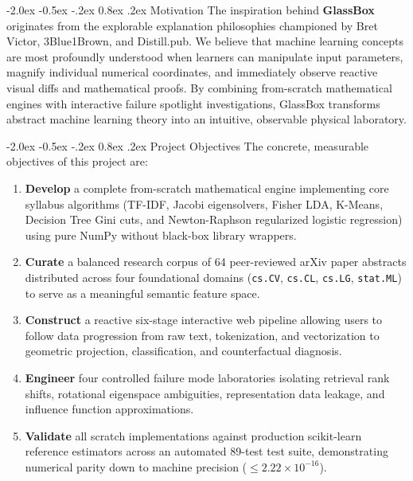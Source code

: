 \documentclass[12pt,a4paper]{report}
\makeatletter
\newenvironment{tightenumerate}{%
  \begin{enumerate}%
    \setlength{\itemsep}{1.5pt}%
    \setlength{\parskip}{0pt}%
    \setlength{\parsep}{0pt}%
}{%
  \end{enumerate}%
}
\renewcommand\section{\@startsection {section}{1}{\z@}%
                                   {-2.0ex \@plus -0.5ex \@minus -.2ex}%
                                   {0.8ex \@plus.2ex}%
                                   {\normalfont\fontsize{14}{17}\bfseries\color{headerblue}}}
\makeatother
\begin{document}
\section{Motivation}
The inspiration behind \textbf{GlassBox} originates from the explorable explanation philosophies championed by Bret Victor, 3Blue1Brown, and Distill.pub. We believe that machine learning concepts are most profoundly understood when learners can manipulate input parameters, magnify individual numerical coordinates, and immediately observe reactive visual diffs and mathematical proofs. By combining from-scratch mathematical engines with interactive failure spotlight investigations, GlassBox transforms abstract machine learning theory into an intuitive, observable physical laboratory.

\section{Project Objectives}
The concrete, measurable objectives of this project are:
\begin{tightenumerate}
    \item \textbf{Develop} a complete from-scratch mathematical engine implementing core syllabus algorithms (TF-IDF, Jacobi eigensolvers, Fisher LDA, K-Means, Decision Tree Gini cuts, and Newton-Raphson regularized logistic regression) using pure NumPy without black-box library wrappers.
    \item \textbf{Curate} a balanced research corpus of 64 peer-reviewed arXiv paper abstracts distributed across four foundational domains (\texttt{cs.CV}, \texttt{cs.CL}, \texttt{cs.LG}, \texttt{stat.ML}) to serve as a meaningful semantic feature space.
    \item \textbf{Construct} a reactive six-stage interactive web pipeline allowing users to follow data progression from raw text, tokenization, and vectorization to geometric projection, classification, and counterfactual diagnosis.
    \item \textbf{Engineer} four controlled failure mode laboratories isolating retrieval rank shifts, rotational eigenspace ambiguities, representation data leakage, and influence function approximations.
    \item \textbf{Validate} all scratch implementations against production scikit-learn reference estimators across an automated 89-test test suite, demonstrating numerical parity down to machine precision ($\le 2.22 \times 10^{-16}$).
\end{tightenumerate}
\end{document}
